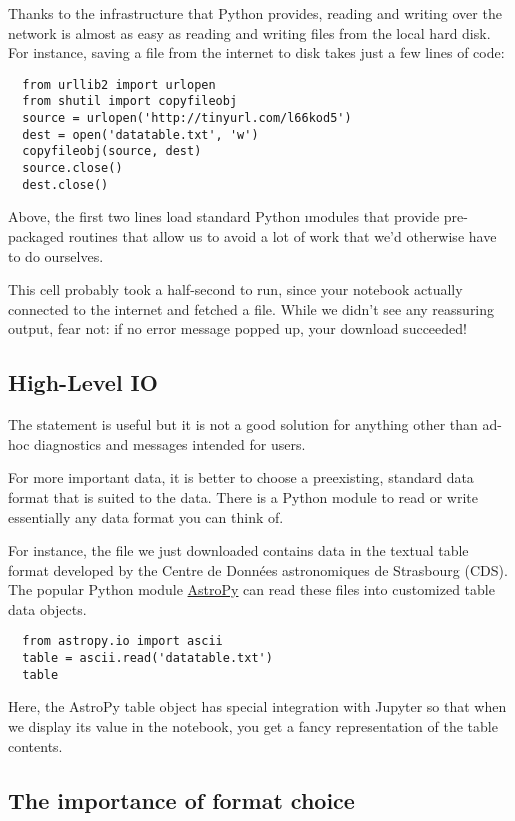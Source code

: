 \documentclass[letterpaper, 12pt, titlepage, twoside]{article}
\begin{document}
Thanks to the infrastructure that Python provides, reading and writing over
the network is almost as easy as reading and writing files from the local hard
disk. For instance, saving a file from the internet to disk takes just a few
lines of code:

\begin{lstlisting}
  from urllib2 import urlopen
  from shutil import copyfileobj
  source = urlopen('http://tinyurl.com/l66kod5')
  dest = open('datatable.txt', 'w')
  copyfileobj(source, dest)
  source.close()
  dest.close()
\end{lstlisting}

Above, the first two lines load standard Python \i{modules} that provide
pre-packaged routines that allow us to avoid a lot of work that we'd otherwise
have to do ourselves.

This cell probably took a half-second to run, since your notebook actually
connected to the internet and fetched a file. While we didn't see any
reassuring output, fear not: if no error message popped up, your download
succeeded!


\subsection*{High-Level IO}

The  statement is useful but it is not a good solution for anything
other than ad-hoc diagnostics and messages intended for users.

For more important data, it is better to choose a preexisting, standard data
format that is suited to the data. There is a Python module to read or write
essentially any data format you can think of.

For instance, the file we just downloaded contains data in the textual table
format developed by the Centre de Données astronomiques de Strasbourg (CDS).
The popular Python module \href{http://www.astropy.org/}{AstroPy} can read
these files into customized table data objects.

\begin{lstlisting}
  from astropy.io import ascii
  table = ascii.read('datatable.txt')
  table
\end{lstlisting}

Here, the AstroPy table object has special integration with Jupyter so that
when we display its value in the notebook, you get a fancy representation of
the table contents.

\subsection*{The importance of format choice}
\end{document}
